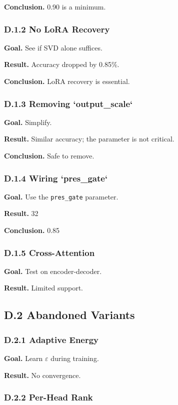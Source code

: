 \textbf{Conclusion.} 0.90 is a minimum.

\subsubsection{D.1.2 No LoRA Recovery}

\textbf{Goal.} See if SVD alone suffices.

\textbf{Result.} Accuracy dropped by 0.85\%.

\textbf{Conclusion.} LoRA recovery is essential.

\subsubsection{D.1.3 Removing `output\_scale`}

\textbf{Goal.} Simplify.

\textbf{Result.} Similar accuracy; the parameter is not critical.

\textbf{Conclusion.} Safe to remove.

\subsubsection{D.1.4 Wiring `pres\_gate`}

\textbf{Goal.} Use the \texttt{pres\_gate} parameter.

\textbf{Result.} 32

\textbf{Conclusion.} 0.85

\subsubsection{D.1.5 Cross-Attention}

\textbf{Goal.} Test on encoder-decoder.

\textbf{Result.} Limited support.

\subsection{D.2 Abandoned Variants}

\subsubsection{D.2.1 Adaptive Energy}

\textbf{Goal.} Learn $\varepsilon$ during training.

\textbf{Result.} No convergence.

\subsubsection{D.2.2 Per-Head Rank}

